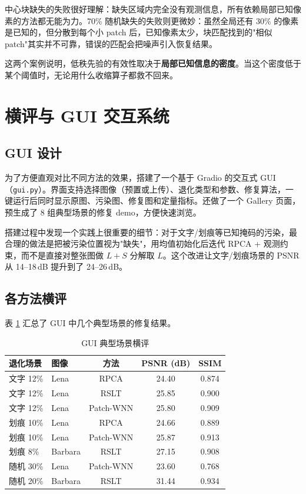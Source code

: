 \documentclass[10.5pt, a4paper]{article}
\begin{document}
中心块缺失的失败很好理解：缺失区域内完全没有观测信息，所有依赖局部已知像素的方法都无能为力。70\% 随机缺失的失败则更微妙：虽然全局还有 30\% 的像素是已知的，但分散到每个小 patch 后，已知像素太少，块匹配找到的"相似 patch"其实并不可靠，错误的匹配会把噪声引入恢复结果。

这两个案例说明，低秩先验的有效性取决于\textbf{局部已知信息的密度}。当这个密度低于某个阈值时，无论用什么收缩算子都救不回来。

\section{横评与 GUI 交互系统}
\label{sec:gui}

\subsection{GUI 设计}

为了方便直观对比不同方法的效果，搭建了一个基于 Gradio 的交互式 GUI（\texttt{gui.py}）。界面支持选择图像（预置或上传）、退化类型和参数、修复算法，一键运行后同时显示原图、污染图、修复图和定量指标。还做了一个 Gallery 页面，预生成了 8 组典型场景的修复 demo，方便快速浏览。

搭建过程中发现一个实践上很重要的细节：对于文字/划痕等已知掩码的污染，最合理的做法是把被污染位置视为"缺失"，用均值初始化后迭代 RPCA + 观测约束，而不是直接对整张图做 $L+S$ 分解取 $L$。这个改进让文字/划痕场景的 PSNR 从 14--18\,dB 提升到了 24--26\,dB。

\subsection{各方法横评}

表 \ref{tab:gui_bench} 汇总了 GUI 中几个典型场景的修复结果。

\begin{table}[H]
\centering
\caption{GUI 典型场景横评}
\label{tab:gui_bench}
\small
\begin{tabular}{llccc}
\toprule
退化场景 & 图像 & 方法 & PSNR (dB) & SSIM \\
\midrule
文字 12\% & Lena     & RPCA      & 24.40 & 0.874 \\
文字 12\% & Lena     & RSLT      & 25.85 & 0.900 \\
文字 12\% & Lena     & Patch-WNN & 25.80 & 0.909 \\
\midrule
划痕 10\% & Lena     & RPCA      & 24.66 & 0.889 \\
划痕 10\% & Lena     & Patch-WNN & 25.87 & 0.913 \\
划痕 8\%  & Barbara  & RSLT      & 27.15 & 0.908 \\
\midrule
随机 30\% & Lena     & Patch-WNN & 23.60 & 0.768 \\
随机 20\% & Barbara  & RSLT      & 31.44 & 0.934 \\
\bottomrule
\end{tabular}
\end{table}
\end{document}
